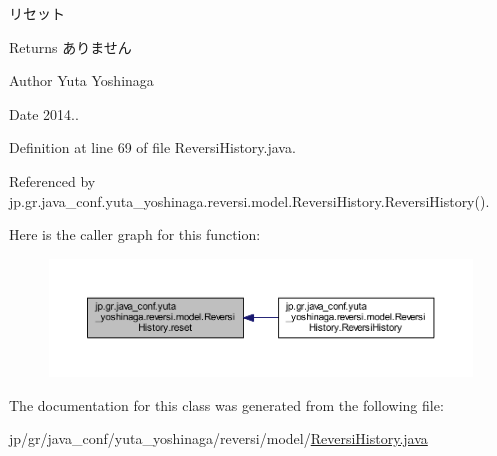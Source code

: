 リセット 

\begin{DoxyReturn}{Returns}
ありません 
\end{DoxyReturn}
\begin{DoxyAuthor}{Author}
Yuta Yoshinaga 
\end{DoxyAuthor}
\begin{DoxyDate}{Date}
2014.. 
\end{DoxyDate}


Definition at line 69 of file Reversi\+History.\+java.



Referenced by jp.\+gr.\+java\+\_\+conf.\+yuta\+\_\+yoshinaga.\+reversi.\+model.\+Reversi\+History.\+Reversi\+History().

Here is the caller graph for this function\+:\nopagebreak
\begin{figure}[H]
\begin{center}
\leavevmode
\includegraphics[width=350pt]{classjp_1_1gr_1_1java__conf_1_1yuta__yoshinaga_1_1reversi_1_1model_1_1_reversi_history_aee0155159a017671c2b18c1d8229d8d1_icgraph}
\end{center}
\end{figure}


The documentation for this class was generated from the following file\+:\begin{DoxyCompactItemize}
\item 
jp/gr/java\+\_\+conf/yuta\+\_\+yoshinaga/reversi/model/\mbox{\hyperlink{_reversi_history_8java}{Reversi\+History.\+java}}\end{DoxyCompactItemize}
